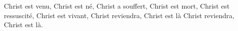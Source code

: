 Christ est venu, Christ est né, Christ a souffert, Christ est mort, 
Christ est ressuscité, Christ est vivant, Christ reviendra, Christ est là 
Christ reviendra, Christ est là.
